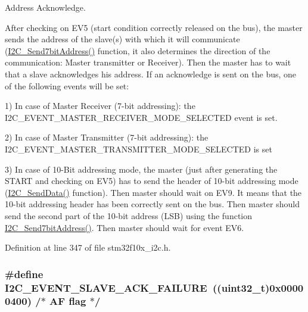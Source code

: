 Address Acknowledge. 

After checking on E\+V5 (start condition correctly released on the bus), the master sends the address of the slave(s) with which it will communicate (\hyperlink{group___i2_c___private___functions_ga009fc2a5b2313c36da39ece39a1156a6}{I2\+C\+\_\+\+Send7bit\+Address()} function, it also determines the direction of the communication\+: Master transmitter or Receiver). Then the master has to wait that a slave acknowledges his address. If an acknowledge is sent on the bus, one of the following events will be set\+:

1) In case of Master Receiver (7-\/bit addressing)\+: the I2\+C\+\_\+\+E\+V\+E\+N\+T\+\_\+\+M\+A\+S\+T\+E\+R\+\_\+\+R\+E\+C\+E\+I\+V\+E\+R\+\_\+\+M\+O\+D\+E\+\_\+\+S\+E\+L\+E\+C\+T\+ED event is set.

2) In case of Master Transmitter (7-\/bit addressing)\+: the I2\+C\+\_\+\+E\+V\+E\+N\+T\+\_\+\+M\+A\+S\+T\+E\+R\+\_\+\+T\+R\+A\+N\+S\+M\+I\+T\+T\+E\+R\+\_\+\+M\+O\+D\+E\+\_\+\+S\+E\+L\+E\+C\+T\+ED is set

3) In case of 10-\/\+Bit addressing mode, the master (just after generating the S\+T\+A\+RT and checking on E\+V5) has to send the header of 10-\/bit addressing mode (\hyperlink{group___i2_c___private___functions_ga7bd9e70b8eafde0dd5eb42b0d95fe1a9}{I2\+C\+\_\+\+Send\+Data()} function). Then master should wait on E\+V9. It means that the 10-\/bit addressing header has been correctly sent on the bus. Then master should send the second part of the 10-\/bit address (L\+SB) using the function \hyperlink{group___i2_c___private___functions_ga009fc2a5b2313c36da39ece39a1156a6}{I2\+C\+\_\+\+Send7bit\+Address()}. Then master should wait for event E\+V6. 

Definition at line 347 of file stm32f10x\+\_\+i2c.\+h.

\subsubsection[{\texorpdfstring{I2\+C\+\_\+\+E\+V\+E\+N\+T\+\_\+\+S\+L\+A\+V\+E\+\_\+\+A\+C\+K\+\_\+\+F\+A\+I\+L\+U\+RE}{I2C_EVENT_SLAVE_ACK_FAILURE}}]{\setlength{\rightskip}{0pt plus 5cm}\#define I2\+C\+\_\+\+E\+V\+E\+N\+T\+\_\+\+S\+L\+A\+V\+E\+\_\+\+A\+C\+K\+\_\+\+F\+A\+I\+L\+U\+RE~(({\bf uint32\+\_\+t})0x00000400)  /$\ast$ A\+F flag $\ast$/}\hypertarget{group___i2_c___events_ga249bd611f1ca64653c0bfc606c591088}{}\label{group___i2_c___events_ga249bd611f1ca64653c0bfc606c591088}


